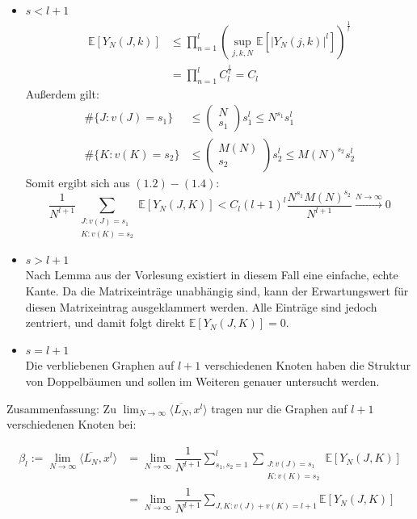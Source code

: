 \documentclass[a4paper, 11pt]{scrreprt}
\newcommand{\EE}{\mathbb{E}}
\begin{document}
\begin{itemize}
	\item \(s < l+ 1\)\\
		\begin{equation}
			\begin{split}
			\EE[Y_N(J,k)] &\leq \prod_{n=1}^l \left(\sup_{j,k,N}\EE\left[|Y_N(j,k)|^l\right]\right)^{\frac 1 l} \\
			& = \prod_{n=1}^l C_l^{\frac 1 l} = C_l
			\end{split}
			\end{equation}
	Außerdem gilt: 
		\begin{align}
			\#\{J: v(J)=s_1\} &\leq \begin{pmatrix} N \\ s_1 \end{pmatrix} s_1^l \leq N^{s_1}s_1^l \\
			\#\{K: v(K)=s_2\} &\leq \begin{pmatrix} M(N) \\ s_2 \end{pmatrix} s_2^l \leq M(N)^{s_2}s_2^l
		\end{align}
	Somit ergibt sich aus \((1.2) - (1.4)\): 
	\begin{equation}
		\frac {1}{N^{l+1}} \sum_{\substack{J:v(J)=s_1\\ K:v(K)=s_2 }} \EE[Y_N(J,K)] < C_l (l+1)^l \frac{N^{s_1} M(N)^{s_2}}{N^{l+1}} \xrightarrow{N\to\infty} 0
	\end{equation}
		
	\item \(s> l+1\) \\
		Nach Lemma aus der Vorlesung existiert in diesem Fall eine einfache, echte Kante. Da die Matrixeinträge unabhängig sind, kann der Erwartungswert für diesen Matrixeintrag ausgeklammert werden. Alle Einträge sind jedoch zentriert, und damit folgt direkt \(\EE[Y_N(J,K)]=0\).
	\item \(s=l+1\)\\
		Die verbliebenen Graphen auf \(l+1\) verschiedenen Knoten haben die Struktur von Doppelbäumen und sollen im Weiteren genauer untersucht werden.\\
\end{itemize}		
Zusammenfassung: Zu \(\lim_{N\to\infty} \langle \overline{L_N}, x^l \rangle \) tragen nur die Graphen auf $ l+1 $ verschiedenen Knoten bei:

\begin{equation}
\begin{split}
\beta_l:= \lim_{N\to\infty} \langle \overline{L_N}, x^l \rangle &= \lim_{N\to\infty} \dfrac{1}{N^{l+1}} \sum_{s_1,s_2 = 1}^l \sum_{\substack{J:v(J)=s_1\\ K:v(K)=s_2 }} \EE[Y_N(J,K)]\\ &= \lim_{N\to\infty} \dfrac{1}{N^{l+1}}\sum_{J,K: v(J)+v(K) = l+1} \EE[Y_N(J,K)]  
\end{split}
\end{equation}\\
\end{document}
